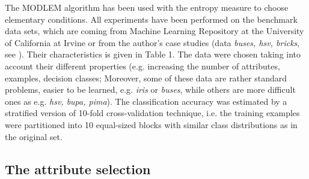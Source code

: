 \documentclass{elsart}
\begin{document}
The MODLEM algorithm has been used with the entropy measure to choose
elementary conditions. All experiments have been performed on the benchmark
data sets, which are coming from Machine Learning Repository at the
University of California at Irvine \cite{irvine} or from the author's case
studies (data \emph{buses, hsv, bricks}, see \cite{Stef01hab}). Their
characteristics is given in  Table 1. The data were chosen taking into
account their different properties (e.g. increasing the number of
attributes, examples, decision classes; Moreover, some of these data are
rather standard problems, easier to be learned, e.g. \emph{iris} or
\emph{buses}, while others are more difficult ones as e.g. \emph{hsv, bupa,
pima}). The classification accuracy was estimated by a stratified version of
10-fold cross-validation technique, i.e. the training examples were
partitioned into 10 equal-sized blocks with similar class distributions as
in the original set.


\subsection{The attribute selection}
\end{document}
